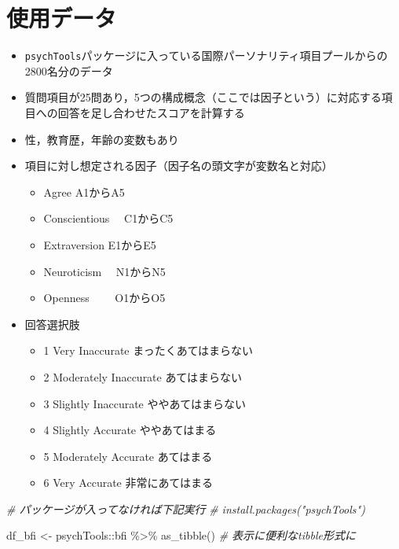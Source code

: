\documentclass[
  xelatex,ja=standard, b5paper]{bxjsbook}
\newenvironment{Shaded}{\begin{snugshade}}{\end{snugshade}}
\newcommand{\CommentTok}[1]{\textcolor[rgb]{0.56,0.35,0.01}{\textit{#1}}}
\newcommand{\FunctionTok}[1]{\textcolor[rgb]{0.00,0.00,0.00}{#1}}
\newcommand{\NormalTok}[1]{#1}
\newcommand{\OtherTok}[1]{\textcolor[rgb]{0.56,0.35,0.01}{#1}}
\newcommand{\SpecialCharTok}[1]{\textcolor[rgb]{0.00,0.00,0.00}{#1}}
\providecommand{\tightlist}{%
  \setlength{\itemsep}{0pt}\setlength{\parskip}{0pt}}
\begin{document}
\hypertarget{mu-read}{%
\section{使用データ}\label{mu-read}}

\begin{itemize}
\tightlist
\item
  \texttt{psychTools}パッケージに入っている国際パーソナリティ項目プールからの2800名分のデータ
\item
  質問項目が25問あり，5つの構成概念（ここでは因子という）に対応する項目への回答を足し合わせたスコアを計算する
\item
  性，教育歴，年齢の変数もあり
\item
  項目に対し想定される因子（因子名の頭文字が変数名と対応）

  \begin{itemize}
  \tightlist
  \item
    Agree A1からA5
  \item
    Conscientious　 C1からC5
  \item
    Extraversion E1からE5
  \item
    Neuroticism　 N1からN5
  \item
    Openness　　 O1からO5
  \end{itemize}
\item
  回答選択肢

  \begin{itemize}
  \tightlist
  \item
    1 Very Inaccurate まったくあてはまらない
  \item
    2 Moderately Inaccurate あてはまらない
  \item
    3 Slightly Inaccurate ややあてはまらない
  \item
    4 Slightly Accurate ややあてはまる
  \item
    5 Moderately Accurate あてはまる
  \item
    6 Very Accurate 非常にあてはまる
  \end{itemize}
\end{itemize}

\begin{Shaded}
\begin{Highlighting}[]
\CommentTok{\# パッケージが入ってなければ下記実行}
\CommentTok{\# install.packages("psychTools")}

\NormalTok{df\_bfi }\OtherTok{\textless{}{-}} 
\NormalTok{  psychTools}\SpecialCharTok{::}\NormalTok{bfi }\SpecialCharTok{\%\textgreater{}\%} 
  \FunctionTok{as\_tibble}\NormalTok{()         }\CommentTok{\# 表示に便利なtibble形式に}
\end{Highlighting}
\end{Shaded}
\end{document}
